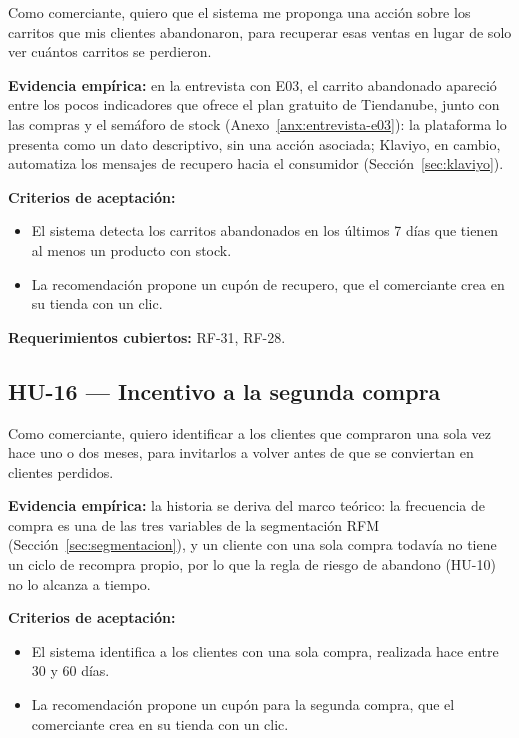 Como comerciante, quiero que el sistema me proponga una acción sobre los carritos que mis clientes abandonaron, para recuperar esas ventas en lugar de solo ver cuántos carritos se perdieron.

\noindent\textbf{Evidencia empírica:} en la entrevista con E03, el carrito abandonado apareció entre los pocos indicadores que ofrece el plan gratuito de Tiendanube, junto con las compras y el semáforo de stock (Anexo~\ref{anx:entrevista-e03}): la plataforma lo presenta como un dato descriptivo, sin una acción asociada; Klaviyo, en cambio, automatiza los mensajes de recupero hacia el consumidor (Sección~\ref{sec:klaviyo}).

\noindent\textbf{Criterios de aceptación:}
\begin{itemize}
    \item El sistema detecta los carritos abandonados en los últimos 7 días que tienen al menos un producto con stock.
    \item La recomendación propone un cupón de recupero, que el comerciante crea en su tienda con un clic.
\end{itemize}

\noindent\textbf{Requerimientos cubiertos:} RF-31, RF-28.

\subsection{HU-16 --- Incentivo a la segunda compra}
\label{sec:hu-16}

Como comerciante, quiero identificar a los clientes que compraron una sola vez hace uno o dos meses, para invitarlos a volver antes de que se conviertan en clientes perdidos.

\noindent\textbf{Evidencia empírica:} la historia se deriva del marco teórico: la frecuencia de compra es una de las tres variables de la segmentación RFM (Sección~\ref{sec:segmentacion}), y un cliente con una sola compra todavía no tiene un ciclo de recompra propio, por lo que la regla de riesgo de abandono (HU-10) no lo alcanza a tiempo.

\noindent\textbf{Criterios de aceptación:}
\begin{itemize}
    \item El sistema identifica a los clientes con una sola compra, realizada hace entre 30 y 60 días.
    \item La recomendación propone un cupón para la segunda compra, que el comerciante crea en su tienda con un clic.
\end{itemize}

